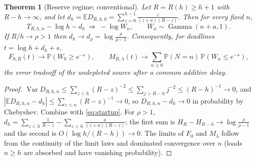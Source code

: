 \documentclass[11pt,a4paper]{article}
\theoremstyle{plain}
\newtheorem{theorem}{Theorem}[section]
\theoremstyle{definition}
\theoremstyle{remark}
\newcommand{\Prob}{\mathbb P}
\newcommand{\E}{\mathbb E}
\newcommand{\Var}{\operatorname{Var}}
\DeclareMathOperator{\Gam}{Gamma}
\begin{document}
\begin{theorem}[Reserve regime; conventional]\label{thm:reserve}
Let $R=R(h)\ge h+1$ with $R-h\to\infty$, and let $d_h=\E D_{R,h,0}=\sum_{z=0}^{h-1}\frac{z}{(z+a)(R-z)}$. Then for every fixed $n$,
\[
T_{R,h,n}-\log h-d_h\ \Rightarrow\ -\log W_n,\qquad W_n\sim\Gam(n+a,1).
\]
If $R/h\to\rho>1$ then $d_h\to d_\rho=\log\frac{\rho}{\rho-1}$. Consequently, for deadlines $t=\log h+d_h+s$,
\[
F_{0,R}(t)\to\Prob(W_0\ge e^{-s}),\qquad M_{R,\lambda}(t)\to\sum_{n\ge0}\Prob(N=n)\,\Prob(W_n\le e^{-s}),
\]
the error tradeoff of the undepleted source after a common additive delay.
\end{theorem}
\begin{proof}
$\Var D_{R,h,n}\le\sum_{z<h}(R-z)^{-2}\le\sum_{j>R-h}j^{-2}\le(R-h)^{-1}\to0$, and $|\E D_{R,h,n}-d_h|\le\sum_{z<n}(R-z)^{-1}\to0$, so $D_{R,h,n}-d_h\to0$ in probability by Chebyshev. Combine with \eqref{eq:startup}. For $\rho>1$, $d_h=\sum_{z<h}\frac1{R-z}-\sum_{z<h}\frac{a}{(z+a)(R-z)}$; the first sum is $H_R-H_{R-h}\to\log\frac\rho{\rho-1}$ and the second is $O(\log h/(R-h))\to0$. The limits of $F_0$ and $M_\lambda$ follow from the continuity of the limit laws and dominated convergence over $n$ (loads $n\ge h$ are absorbed and have vanishing probability).
\end{proof}
\end{document}

